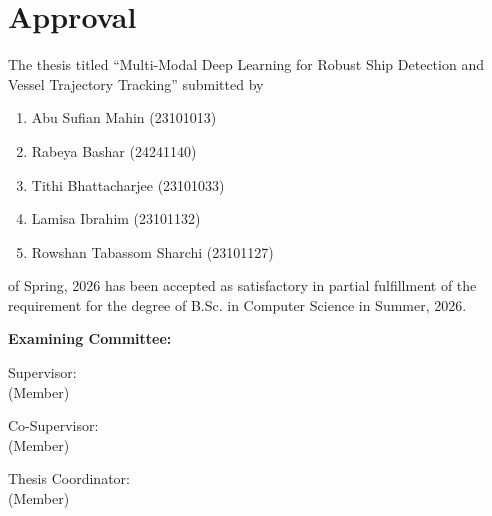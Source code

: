 \section*{Approval}

The thesis titled “Multi-Modal Deep Learning for Robust Ship Detection and
Vessel Trajectory Tracking” submitted by 
\begin{enumerate}
  \item Abu Sufian Mahin (23101013)
  \item Rabeya Bashar (24241140)
  \item Tithi Bhattacharjee (23101033)
  \item Lamisa Ibrahim (23101132)
  \item Rowshan Tabassom Sharchi (23101127)
\end{enumerate}

of Spring, 2026 has been accepted as satisfactory in partial fulfillment of the requirement for the degree of B.Sc. in Computer Science in Summer, 2026. 

\pagebreak

\vspace{0.5cm}
\textbf{Examining Committee:}

\vspace{1cm}

Supervisor:\\
(Member)
\begin{center}
    \hspace{7cm}  \hspace{1cm} 
\end{center}

Co-Supervisor:\\
(Member)
\begin{center}
    \hspace{7cm}  \hspace{1cm} 
\end{center}


Thesis Coordinator:\\
(Member)
\begin{center}
    \hspace{7cm}  \hspace{1cm} 
\end{center}

